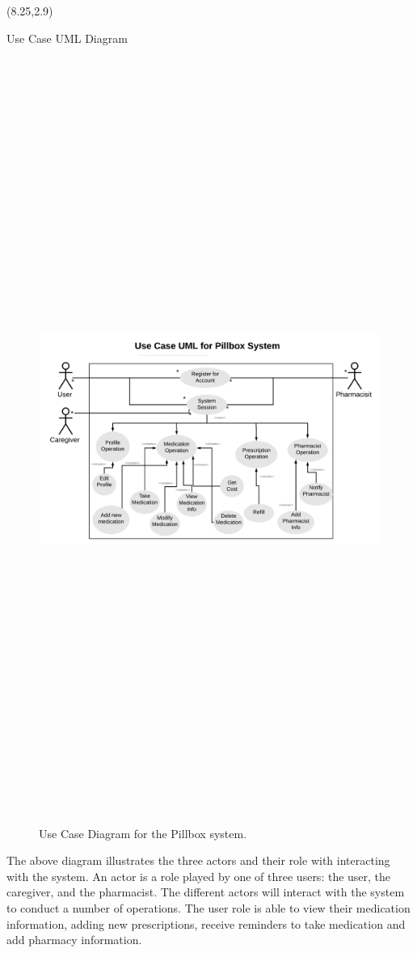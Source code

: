 \documentclass[22pt]{beamer}
\begin{document}
\begin{frame}[fragile]
\begin{textblock}{7.25}(8.25,2.9)

\begin{block}{Use Case UML Diagram}

\begin{figure}
\begin{center}
\includegraphics[height=25cm, width=40cm]{UseCaseUML.png}
\end{center}
\caption{Use Case Diagram for the Pillbox system. }
\end{figure}
The above diagram illustrates the three actors and their role with interacting with the system. An actor is a role played by one of three users: the user, the caregiver, and the pharmacist. The different actors will interact with the system to conduct a number of operations. The user role is able to view their medication information, adding new prescriptions, receive reminders to take medication and add pharmacy information. \\


\end{block}
\end{textblock}
\end{frame}
\end{document}
